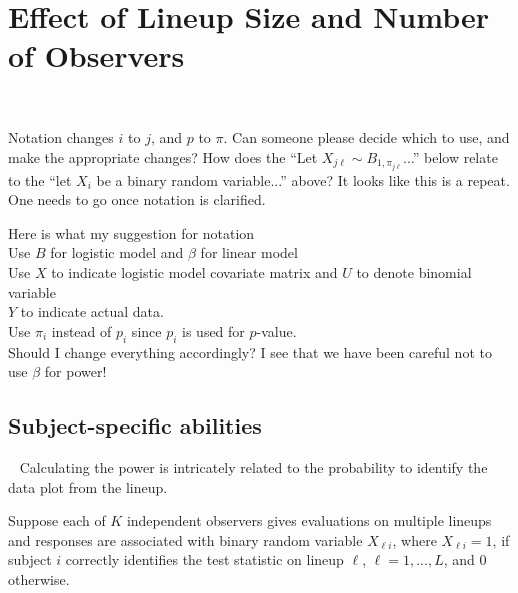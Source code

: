 \documentclass{article}
\newcommand{\red}[1]{{\color{red} #1}}
\newcommand{\green}[1]{{\color{green} #1}} %
\begin{document}
\section{Effect of Lineup Size and Number of Observers}~\label{sec:size}

\green{Notation changes $i$ to $j$, and $p$ to $\pi$. Can someone please decide which to use, and make the appropriate changes? How does the ``Let $X_{j\ell} \sim B_{1, \pi_{j\ell}}$...'' below relate to the ``let $X_i$ be a binary random variable...'' above? It looks like this is a repeat. One needs to go once notation is clarified.}

\red{Here is what my suggestion for notation \\  Use $B$ for logistic model and $\beta$ for linear model \\ Use $X$ to indicate logistic model covariate matrix and $U$ to denote binomial variable \\ $Y$ to indicate actual data. \\ Use $\pi_i$ instead of $p_i$ since $p_i$ is used for $p$-value.  \\ Should I change everything accordingly? I see that we have been careful not to use $\beta$ for power! }

\subsection{Subject-specific abilities}~\label{sec:model}
Calculating the power  is intricately related to the probability to identify the data plot from the lineup. 

Suppose each of $K$ independent observers gives evaluations on multiple lineups and responses are associated with binary random variable $X_{\ell i}$, where  $X_{\ell i} = 1$, if subject $i$ correctly identifies the test statistic on lineup $\ell$,  $\ell = 1, ..., L$, and 0 otherwise.
\end{document}
